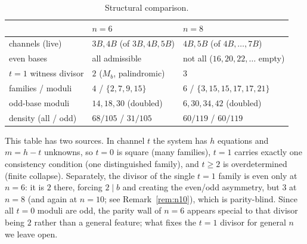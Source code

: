 \documentclass[11pt]{amsart}
\theoremstyle{definition}
\begin{document}
\begin{table}[ht]
\caption{Structural comparison.}\label{tab:compare}
\begin{tabular}{lll}
\toprule
 & $n=6$ & $n=8$ \\
\midrule
channels (live) & $3B,4B$ (of $3B,4B,5B$) & $4B,5B$ (of $4B,\dots,7B$) \\
even bases & all admissible & not all ($16,20,22,\dots$ empty) \\
$t=1$ witness divisor & $2$ ($M_b$, palindromic) & $3$ \\
families / moduli & $4$ / $\{2,7,9,15\}$ & $6$ / $\{3,15,15,17,17,21\}$ \\
odd-base moduli & $14,18,30$ (doubled) & $6,30,34,42$ (doubled) \\
density (all / odd) & $68/105$ / $31/105$ & $60/119$ / $60/119$ \\
\bottomrule
\end{tabular}
\end{table}

This table has two sources. In channel $t$ the system has $h$
equations and $m=h-t$ unknowns, so $t=0$ is square (many families),
$t=1$ carries exactly one consistency condition (one distinguished
family), and $t\ge2$ is overdetermined (finite collapse). Separately,
the divisor of the single $t=1$ family is even only at $n=6$: it is
$2$ there, forcing $2\mid b$ and creating the even/odd asymmetry, but
$3$ at $n=8$ (and again at $n=10$; see Remark~\ref{rem:n10}), which is
parity-blind. Since all $t=0$ moduli are odd, the parity wall of $n=6$
appears special to that divisor being $2$ rather than a general
feature; what fixes the $t=1$ divisor for general $n$ we leave open.
\end{document}

